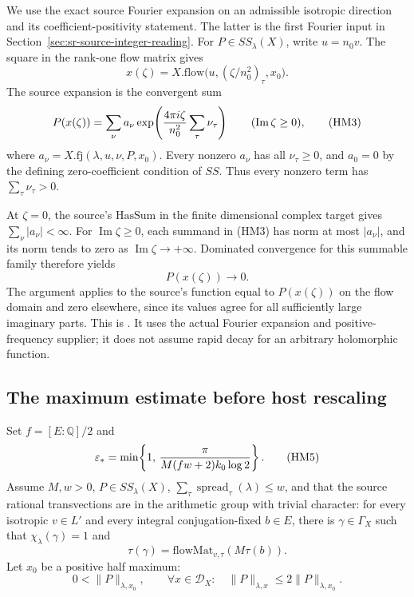 We use the exact source Fourier expansion on an admissible
isotropic direction and its coefficient-positivity statement.
The latter is the first Fourier input in
Section~\ref{sec:sr-source-integer-reading}.
For \(P\in SS_\lambda(X)\), write \(u=n_0v\).
The square in the rank-one flow matrix gives
\[
      x(\zeta)
        =X.\mathrm{flow}\bigl(u,(\zeta/n_0^2)_\tau,x_0\bigr).
 \tag{HM2}\label{eq:sr-source-flow-rescale}
\]
The source expansion is the convergent sum
\[
 P(x(\zeta))=\sum_\nu a_\nu
       \exp\!\left({4\pi i\zeta\over n_0^2}
                              \sum_\tau\nu_\tau\right)
                  \qquad(\operatorname{Im}\zeta\ge0),
 \tag{HM3}\label{eq:sr-source-isotropic-expansion}
\]
where \(a_\nu=X.\mathrm{fj}(\lambda,u,\nu,P,x_0)\).
Every nonzero \(a_\nu\) has all \(\nu_\tau\ge0\), and
\(a_0=0\) by the defining zero-coefficient condition of \(SS\).
Thus every nonzero term has \(\sum_\tau\nu_\tau>0\).

At \(\zeta=0\), the source's \(\mathrm{HasSum}\) in the finite
dimensional complex target gives \(\sum_\nu|a_\nu|<\infty\).
For \(\operatorname{Im}\zeta\ge0\), each summand in (HM3) has
norm at most \(|a_\nu|\), and its norm tends to zero as
\(\operatorname{Im}\zeta\to+\infty\).
Dominated convergence for this summable family therefore yields
\[
                         P(x(\zeta))\longrightarrow0 .
 \tag{HM4}\label{eq:sr-source-flow-decay}
\]
The argument applies to the source's function equal to
\(P(x(\zeta))\) on the flow domain and zero elsewhere, since its
values agree for all sufficiently large imaginary parts.
This is
.
It uses the actual Fourier expansion and positive-frequency
supplier; it does not assume rapid decay for an arbitrary
holomorphic function.

\subsection{The maximum estimate before host rescaling}
Set \(f=[E:\mathbb Q]/2\) and
\[
 \varepsilon_*=\min\!\left\{1,\,
 {\pi\over M(fw+2)k_0\log2}\right\}.
 \tag{HM5}\label{eq:sr-source-epstar}
\]
Assume \(M,w>0\), \(P\in SS_\lambda(X)\),
\(\sum_\tau\operatorname{spread}_\tau(\lambda)\le w\), and that
the source rational transvections are in the arithmetic group
with trivial character:
for every isotropic \(v\in L'\) and every integral
conjugation-fixed \(b\in E\), there is \(\gamma\in\Gamma_X\)
such that \(\chi_\lambda(\gamma)=1\) and
\[
                  \tau(\gamma)=\mathrm{flowMat}_{v,\tau}
                                                  (M\tau(b)).
 \tag{HM6}\label{eq:sr-source-flow-period}
\]
Let \(x_0\) be a positive half maximum:
\[
 0<\|P\|_{\lambda,x_0},\qquad
 \forall x\in\mathcal D_X:\quad
                 \|P\|_{\lambda,x}\le2\|P\|_{\lambda,x_0}.
 \tag{HM7}\label{eq:sr-source-half-max}
\]

